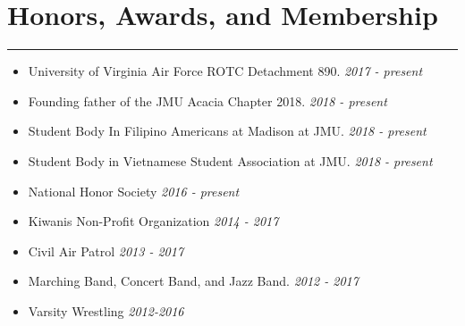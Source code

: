 \documentclass[a4paper]{article}
\begin{document}
\section*{Honors, Awards, and Membership}
\hrule
\vspace{3mm}
\begin{itemize}
	\setlength\itemsep{-0.7mm}
	\item University of Virginia Air Force ROTC Detachment 890.
	\hfill \textit{2017 - present}
	\item Founding father of the JMU Acacia Chapter 2018.
	\hfill \textit{2018 - present}
	\item Student Body In Filipino Americans at Madison at JMU.
	\hfill \textit{2018 - present}
	\item Student Body in Vietnamese Student Association at JMU.
	\hfill \textit{2018 - present}
	\item National Honor Society
	\hfill \textit{2016 - present}
	\item Kiwanis Non-Profit Organization
	\hfill \textit{2014 - 2017}
	\item Civil Air Patrol
	\hfill \textit{2013 - 2017}
	\item Marching Band, Concert Band, and Jazz Band.
	\hfill \textit{2012 - 2017}
	\item Varsity Wrestling
	\hfill \textit{2012-2016}
\end{itemize}
\end{document}

